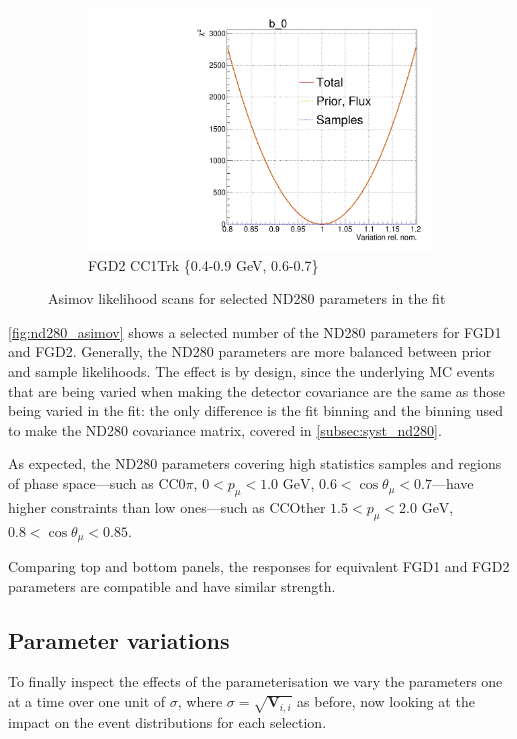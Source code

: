 \begin{figure}[!h]
\begin{subfigure}[t]{0.32\textwidth}
	\includegraphics[width=\textwidth, trim={0mm 0mm 0mm 11mm}, clip,page=542]{figures/mach3/Asimov/Full_LLHscan_18July_BeRPA_U_ND280logL_scan}
	\caption{FGD2 \numubar CC1Trk \{0.4-0.9 GeV, 0.6-0.7\}}
\end{subfigure}
\caption{Asimov likelihood scans for selected ND280 parameters in the fit}
\label{fig:nd280_asimov}
\end{figure}

\autoref{fig:nd280_asimov} shows a selected number of the ND280 parameters for FGD1 and FGD2. Generally, the ND280 parameters are more balanced between prior and sample likelihoods. The effect is by design, since the underlying MC events that are being varied when making the detector covariance are the same as those being varied in the fit: the only difference is the fit binning and the binning used to make the ND280 covariance matrix, covered in \autoref{subsec:syst_nd280}.

As expected, the ND280 parameters covering high statistics samples and regions of phase space---such as CC0$\pi$, $0<p_\mu<1.0\text{ GeV}$, $0.6 < \cos\theta_\mu < 0.7$---have higher constraints than low ones---such as CCOther $1.5 < p_\mu < 2.0\text{ GeV}$, $0.8 < \cos\theta_\mu < 0.85$.

Comparing top and bottom panels, the responses for equivalent FGD1 and FGD2 parameters are compatible and have similar strength.

\subsection{Parameter variations}
\label{sec:sigmavar}
To finally inspect the effects of the parameterisation we vary the parameters one at a time over one unit of $\sigma$, where $\sigma = \sqrt{\mathbf{V}_{i,i}}$ as before, now looking at the impact on the event distributions for each selection.

